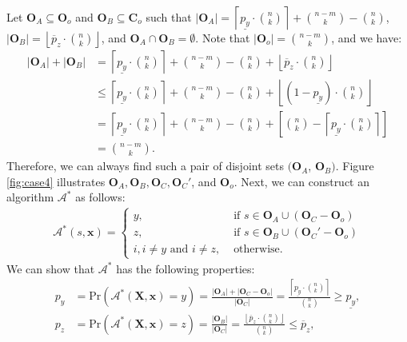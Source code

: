 \documentclass[letterpaper]{article} %
\begin{document}
\begin{enumerate}[label={\bfseries Case \arabic*:}, wide=0pt]
Let $\mathbf{O}_A\subseteq \mathbf{O}_o$ and $\mathbf{O}_B\subseteq \mathbf{C}_o$ such that $|\mathbf{O}_A|=\left\lceil\underline{p_y} \cdot {n \choose k}\right\rceil + {n-m \choose k} - {n \choose k}$, $|\mathbf{O}_B|=\left\lfloor\overline{p}_z \cdot {n \choose k}\right\rfloor$, and $\mathbf{O}_A \cap \mathbf{O}_B=\emptyset$. Note that $|\mathbf{O}_o| = {n-m \choose k}$, and we have:
\begin{align}
|\mathbf{O}_A|+|\mathbf{O}_B| &= \left\lceil\underline{p_y} \cdot {n \choose k}\right\rceil + {n-m \choose k} - {n \choose k} + \left\lfloor\overline{p}_z \cdot {n \choose k}\right\rfloor \\
							&\le \left\lceil\underline{p_y} \cdot {n \choose k}\right\rceil + {n-m \choose k} - {n \choose k} + \left\lfloor(1-\underline{p_y}) \cdot {n \choose k}\right\rfloor \\
							&= \left\lceil\underline{p_y} \cdot {n \choose k}\right\rceil + {n-m \choose k} - {n \choose k} + \left[{n \choose k} - \left\lceil\underline{p_y} \cdot {n \choose k}\right\rceil\right]  \\
							&= {n-m \choose k}.
\end{align}
Therefore, we can always find such a pair of disjoint sets $(\mathbf{O}_A$, $\mathbf{O}_B)$. Figure \ref{fig:case4} illustrates $\mathbf{O}_A, \mathbf{O}_B,\mathbf{O}_C, \mathbf{O}_C'$, and $\mathbf{O}_o$. Next, we can construct an algorithm $\mathcal{A}^*$ as follows:
	\begin{align}
		\mathcal{A}^*(s,\mathbf{x})=
		\begin{cases}
 			y, &\text{ if } s\in \mathbf{O}_A\cup(\mathbf{O}_C - \mathbf{O}_o)\\
			z, &\text{ if } s\in \mathbf{O}_B\cup(\mathbf{O}_C' - \mathbf{O}_o)\\
 			i, i\neq y \text{ and } i\neq z, &\text{ otherwise}.
		\end{cases}
	\end{align}
	We can show that $\mathcal{A}^*$ has the following properties:
	\begin{align}
		p_y &= \text{Pr}(\mathcal{A}^*(\mathbf{X},\mathbf{x})=y) = \frac{|\mathbf{O}_A|+|\mathbf{O}_C-\mathbf{O}_o|}{|\mathbf{O}_C|} = \frac{\left\lceil\underline{p_y} \cdot {n \choose k}\right\rceil}{{n \choose k}}\ge \underline{p_y},\\
		p_z &= \text{Pr}(\mathcal{A}^*(\mathbf{X},\mathbf{x})=z) = \frac{|\mathbf{O}_B|}{|\mathbf{O}_C|} = \frac{\left\lfloor\overline{p}_z \cdot {n \choose k}\right\rfloor}{{n \choose k}} \le\overline{p}_z,
	\end{align}

\end{enumerate}
\end{document}
